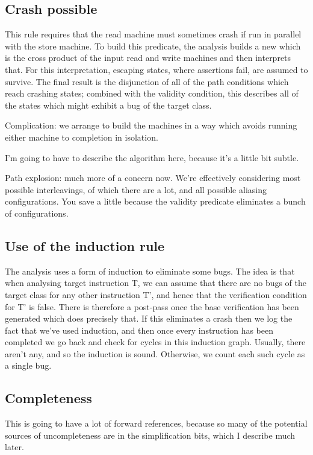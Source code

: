 \documentclass[12pt,a4paper]{book}
\begin{document}
\subsection{Crash possible}

This rule requires that the read machine must sometimes crash if run in parallel with the store machine.
To build this predicate, the analysis builds a new \StateMachine which is the cross product of the input read and write machines and then interprets that.
For this interpretation, escaping states, where assertions fail, are assumed to survive.
The final result is the disjunction of all of the path conditions which reach crashing states; combined with the validity condition, this describes all of the states which might exhibit a bug of the target class.

Complication: we arrange to build the machines in a way which avoids running either machine to completion in isolation.

I'm going to have to describe the algorithm here, because it's a little bit subtle.

Path explosion: much more of a concern now.
We're effectively considering most possible interleavings, of which there are a lot, and all possible aliasing configurations.
You save a little because the validity predicate eliminates a bunch of configurations.

\subsection{Use of the induction rule}

The analysis uses a form of induction to eliminate some bugs.
The idea is that when analysing target instruction T, we can assume that there are no bugs of the target class for any other instruction T', and hence that the verification condition for T' is false.
There is therefore a post-pass once the base verification has been generated which does precisely that.
If this eliminates a crash then we log the fact that we've used induction, and then once every instruction has been completed we go back and check for cycles in this induction graph.
Usually, there aren't any, and so the induction is sound.
Otherwise, we count each such cycle as a single bug.

\subsection{Completeness}
This is going to have a lot of forward references, because so many of the potential sources of uncompleteness are in the simplification bits, which I describe much later.
\end{document}
